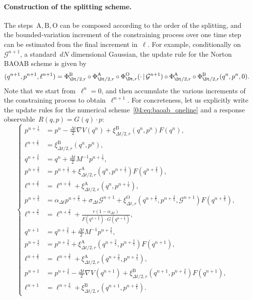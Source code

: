 \paragraph{Construction of the splitting scheme.}
The steps~$\mathrm{A,B,O}$ can be composed according to the order of the splitting, and the bounded-variation increment of the constraining process over one time step can be estimated from the final increment in~$\ell$. For example, conditionally on~$\mathcal{G}^{n+1}$, a standard~$dN$ dimensional Gaussian, the update rule for the Norton BAOAB scheme is given by
\begin{equation}\label{04:eq:baoab_oneline}{(q^{n+1},p^{n+1},\ell^{n+1}) = \Phi_{\Dt/2,r}^{\mathrm{B}}\circ \Phi_{\Dt/2,r}^{\mathrm{A}} \circ \Phi_{\Dt,r}^{\mathrm{O}}(\cdot\,|\,\mathcal G^{n+1})\circ \Phi_{\Dt/2,r}^{\mathrm{A}}\circ\Phi_{\Dt/2,r}^{\mathrm{B}} (q^n,p^n,0)}.\end{equation}
Note that we start from~$\ell^n = 0$, and then accumulate the various increments of the constraining process to obtain~$\ell^{n+1}$.
For concreteness, let us explicitly write the update rules for the numerical scheme~\eqref{04:eq:baoab_oneline} and a response observable~$R(q,p)=G(q)\cdot p$:
\begin{equation}
    \label{04:eq:detailed_baoab}
    \left\{\begin{aligned}
        p^{n+\frac15} &= p^{n}-\frac{\Delta t}2 \nabla V(q^n) + \xi_{\Delta t/2,r}^{\mathrm B}(q^n,p^n)F(q^n),\\
        \ell^{n+\frac15} &= \xi_{\Delta t/2,r}^{\mathrm B}(q^n,p^n),\\
        q^{n+\frac25} &= q^n +\frac{\Delta t}2 M^{-1}p^{n+\frac15},\\
        p^{n+\frac25} &= p^{n+\frac15}+\xi_{\Delta t/2,r}^{\mathrm A}(q^n,p^{n+\frac15})F(q^{n+\frac25}),\\
        \ell^{n+\frac25} &= \ell^{n+\frac15}+\xi_{\Delta t/2,r}^{\mathrm A}(q^n,p^{n+\frac15}),\\
        {p}^{n+\frac 35} &= \alpha_{\Delta t}p^{n+\frac25} + \sigma_{\Delta t} \mathcal{G}^{n+1}+\xi_{\Delta t,r}^{\mathrm O}(q^{n+\frac25},p^{n+\frac25},\mathcal{G}^{n+1})F(q^{n+\frac25}),\\
        \ell^{n+\frac35}&=\ell^{n+\frac25}+\frac{r(1-\alpha_{\Delta t})}{F(q^{n+\frac25})\cdot G(q^{n+\frac25})},\\
        q^{n+1} &= q^{n+\frac25} +\frac{\Delta t}2 M^{-1}p^{n+\frac35},\\
        p^{n+\frac45} &= p^{n+\frac35}+\xi_{\Delta t/2,r}^{\mathrm A}(q^{n+\frac25},p^{n+\frac35})F(q^{n+1}),\\
        \ell^{n+\frac45} &= \ell^{n+\frac35}+\xi_{\Delta t/2,r}^{\mathrm A}(q^{n+\frac25},p^{n+\frac35}),\\
         {p}^{n+1} &= p^{n+\frac45}-\frac{\Delta t}2 \nabla V(q^{n+1})+\xi_{\Delta t/2,r}^{\mathrm B}(q^{n+1},{p}^{n+\frac45})F(q^{n+1}),\\
        \ell^{n+1} &= \ell^{n+\frac45}+\xi_{\Delta t/2,r}^{\mathrm B}(q^{n+1},{p}^{n+\frac45}).
        \end{aligned}\right.
\end{equation}
